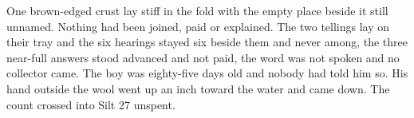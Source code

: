 One brown-edged crust lay stiff in the fold with the empty place beside it still unnamed. Nothing had been joined, paid or explained. The two tellings lay on their tray and the six hearings stayed six beside them and never among, the three near-full answers stood advanced and not paid, the word was not spoken and no collector came. The boy was eighty-five days old and nobody had told him so. His hand outside the wool went up an inch toward the water and came down. The count crossed into Silt 27 unspent.
